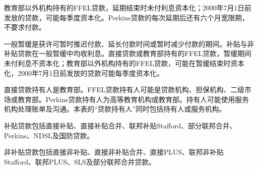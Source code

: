 \documentclass[UTF8,fontset=none,11pt,a4paper]{ctexart}
\begin{document}
教育部以外机构持有的FFEL贷款，延期结束时未付利息资本化；2000年7月1日前发放的贷款，可能每季度资本化。Perkins贷款的每次延期后还有六个月宽限期，不\allowbreak\mbox{要求付款。}


一般暂缓是获许可暂时推迟付款、延长付款时间或暂时减少付款的期间。补贴与非补贴贷款在一般暂缓中均收利息。直接贷款或教育部持有的FFEL贷款，暂缓期间未付利息不资本化；教育部以外机构持有的FFEL贷款，可能在暂缓结束时资本化，2000年7月1日前发放的贷款可能每季\allowbreak\mbox{度资本化。}


直接贷款持有人是教育部。FFEL贷款持有人可能是贷款机构、担保机构、二级市场或教育部。Perkins贷款持有人为高等教育机构或教育部。持有人可能使用服务机构处理账单及沟通。本表的“贷款持有人”同时包括持有人或\allowbreak\mbox{服务机构。}


补贴贷款包括直接补贴、直接补贴合并、联邦补贴Stafford、部分联邦合并、Perkins、NDSL及\allowbreak\mbox{国防贷款。}


非补贴贷款包括直接非补贴、直接非补贴合并、直接PLUS、联邦非补贴Stafford、联邦PLUS、SLS及部分联邦\allowbreak\mbox{合并贷款。}
\end{document}
